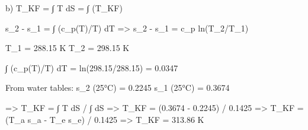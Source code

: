 b) T_KF = ∫ T dS = ∫ (T_KF)  

s_2 - s_1 = ∫ (c_p(T)/T) dT  
=> s_2 - s_1 = c_p ln(T_2/T_1)  

T_1 = 288.15 K  
T_2 = 298.15 K  

∫ (c_p(T)/T) dT = ln(298.15/288.15) = 0.0347  

From water tables:  
s_2 (25°C) = 0.2245  
s_1 (25°C) = 0.3674  

=> T_KF = ∫ T dS / ∫ dS  
=> T_KF = (0.3674 - 0.2245) / 0.1425  
=> T_KF = (T_a s_a - T_e s_e) / 0.1425  
=> T_KF = 313.86 K